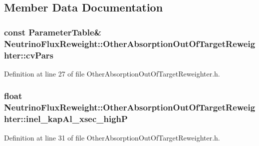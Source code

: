 \subsection{Member Data Documentation}
\hypertarget{class_neutrino_flux_reweight_1_1_other_absorption_out_of_target_reweighter_a1fc316f75f145a3e388f48bbfe458e32}{
\subsubsection[{cv\-Pars}]{\setlength{\rightskip}{0pt plus 5cm}const {\bf Parameter\-Table}\& Neutrino\-Flux\-Reweight\-::\-Other\-Absorption\-Out\-Of\-Target\-Reweighter\-::cv\-Pars}}\label{class_neutrino_flux_reweight_1_1_other_absorption_out_of_target_reweighter_a1fc316f75f145a3e388f48bbfe458e32}


Definition at line 27 of file Other\-Absorption\-Out\-Of\-Target\-Reweighter.\-h.

\hypertarget{class_neutrino_flux_reweight_1_1_other_absorption_out_of_target_reweighter_a7fd78bf2576386f2854cca235f000e2a}{
\subsubsection[{inel\-\_\-kap\-Al\-\_\-xsec\-\_\-high\-P}]{\setlength{\rightskip}{0pt plus 5cm}float Neutrino\-Flux\-Reweight\-::\-Other\-Absorption\-Out\-Of\-Target\-Reweighter\-::inel\-\_\-kap\-Al\-\_\-xsec\-\_\-high\-P\hspace{0.3cm}{\ttfamily [private]}}}\label{class_neutrino_flux_reweight_1_1_other_absorption_out_of_target_reweighter_a7fd78bf2576386f2854cca235f000e2a}


Definition at line 31 of file Other\-Absorption\-Out\-Of\-Target\-Reweighter.\-h.

